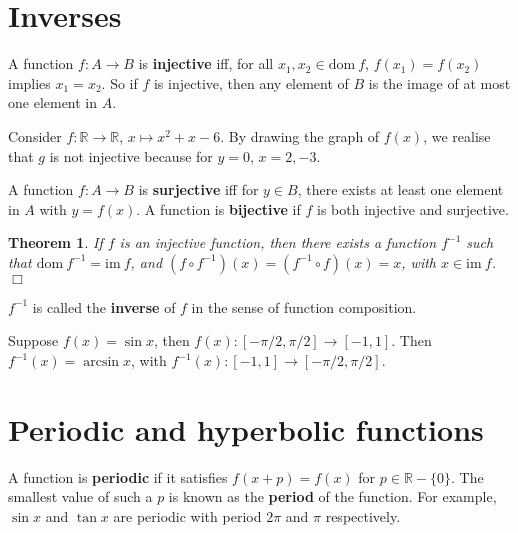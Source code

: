 \documentclass[letter-paper]{tufte-book}
\newtheorem{theorem}{\color{pastel-blue}Theorem}[section]
\newenvironment{example}[1][Example]{\begin{trivlist}
\item[\hskip \labelsep {\bfseries #1}]}{\end{trivlist}}
\newcommand\Def[1]{\textbf{#1}}
\newcommand{\qedwhite}{\hfill \ensuremath{\Box}}
\begin{document}

\section{Inverses}

A function $f:A\rightarrow B$ is \Def{injective} iff, for all $x_1,
x_2\in\mbox{dom}\ f$, $f(x_1)=f(x_2)$ implies $x_1 = x_2$. So if $f$ is
injective, then any element of $B$ is the image of at most one element in $A$.
\begin{example}
  Consider $f:\mathbb{R}\rightarrow\mathbb{R}$, $x\mapsto x^2+x-6$. By drawing 
  the graph of $f(x)$, we realise that $g$ is not injective because for $y=0$, 
  $x=2,-3$.
\end{example}
A function $f:A\rightarrow B$ is \Def{surjective} iff for $y\in B$,
there exists at least one element in $A$ with $y=f(x)$. A function is 
\Def{bijective} if $f$ is both injective and surjective.

\begin{theorem}
  If $f$ is an injective function, then there exists a function $f^{-1}$ such 
  that $\mbox{dom}\ f^{-1}=\mbox{im}\ f$, and $(f\circ f^{-1})(x)
  =(f^{-1}\circ f)(x)=x$, with $x\in\mbox{im}\ f$. \qedwhite
\end{theorem}
$f^{-1}$ is called the \Def{inverse} of $f$ in the sense of function 
composition.
\begin{example}
  Suppose $f(x)=\sin x$, then $f(x):[-\pi/2,\pi/2]\rightarrow[-1,1]$. Then 
  $f^{-1}(x)=\arcsin x$, with $f^{-1}(x):[-1,1]\rightarrow[-\pi/2,\pi/2]$.
\end{example}


\section{Periodic and hyperbolic functions}

A function is \Def{periodic} if it satisfies $f(x+p)=f(x)$ for
$p\in\mathbb{R}-\{0\}$. The smallest value of such a $p$ is known as the
\Def{period} of the function. For example, $\sin x$ and $\tan x$ are 
periodic with period $2\pi$ and $\pi$ respectively.
\end{document}
